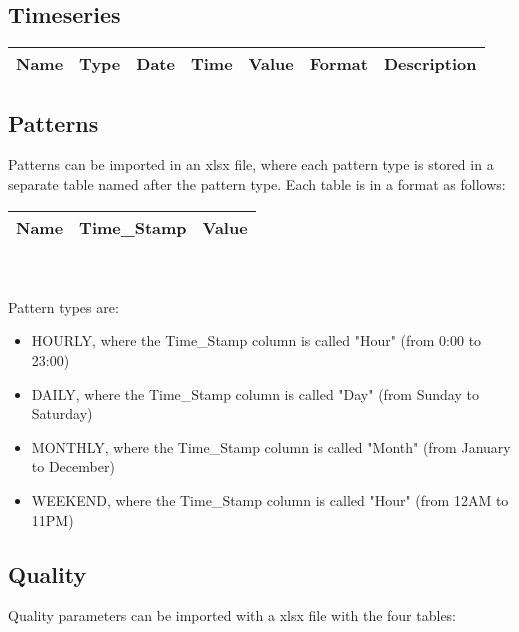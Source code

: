 \documentclass[10pt,a4paper,oneside]{scrbook}
\begin{document}
\subsection{Timeseries}
\begin{tabular}{|p{1.7cm}|p{1.3cm}|P{1.3cm}|P{1.3cm}|P{1.3cm}|P{1.3cm}|P{6cm}|}
\hline 
\textbf{Name} & \textbf{Type} & \textbf{Date} & \textbf{Time} & \textbf{Value} & \textbf{Format} & \textbf{Description}\\ 
\hline
\end{tabular}


\subsection{Patterns}
Patterns can be imported in an xlsx file, 
where each pattern type is stored in a separate table named after the pattern type. Each table is in a format as follows:\\
\begin{tabular}{|p{1.7cm}|p{2.4cm}|P{1.3cm}|}
\hline 
\textbf{Name} & \textbf{Time\_Stamp} & \textbf{Value}\\ 
\hline 
\end{tabular}
\\
\\
Pattern types are:
\begin{itemize}
	\setlength\itemsep{0pt}
	\item HOURLY, where the Time\_Stamp column is called "Hour" (from 0:00 to 23:00)
	\item DAILY, where the Time\_Stamp column is called "Day" (from Sunday to Saturday)
	\item MONTHLY, where the Time\_Stamp column is called "Month" (from January to December)
	\item WEEKEND, where the Time\_Stamp column is called "Hour" (from 12AM to 11PM)
\end{itemize}
\subsection{Quality}
Quality parameters can be imported with a xlsx file with the four tables: 
\end{document}
